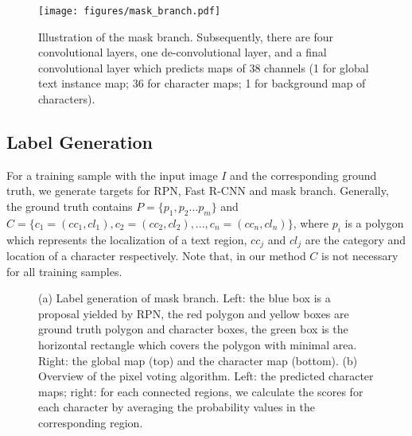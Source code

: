 \documentclass[runningheads]{llncs}
\begin{document}
\begin{figure}[!b]
\begin{center}
\texttt{[image: figures/mask\_branch.pdf]}
\end{center}
\caption{Illustration of the mask branch. Subsequently, there are four convolutional layers, one de-convolutional layer, and a final convolutional layer which predicts maps of 38 channels (1 for global text instance map; 36 for character maps; 1 for background map of characters).}
\label{fig:mask_branch}
\end{figure}

\subsection{Label Generation}
For a training sample with the input image $I$ and the corresponding ground truth,  we generate targets for RPN, Fast R-CNN and mask branch. Generally, the ground truth contains $P=\{p_{1}, p_{2}...p_{m} \}$ and $C=\{c_{1}=(cc_{1},cl_{1}),c_{2}=(cc_{2},cl_{2}), ... , c_{n}=(cc_{n},cl_{n})\}$, where $p_{i}$ is a polygon which represents the localization of a text region, $cc_{j}$ and $cl_{j}$ are the category and location of a character respectively. Note that, in our method $C$ is not necessary for all training samples. 


\begin{figure}[!b]
\begin{center}
\captionsetup[subfigure]{justification=centering}
    \centering
{}
\end{center}
 \caption{(a) Label generation of mask branch. Left: the blue box is a proposal yielded by RPN, the red polygon and yellow boxes are ground truth polygon and character boxes, the green box is the horizontal rectangle which covers the polygon with minimal area. Right: the global map (top) and the character map (bottom). (b) Overview of the pixel voting algorithm. Left: the predicted character maps; right: for each connected regions, we calculate the scores for each character by averaging the probability values in the corresponding region.}
\label{fig:denser-box}
\end{figure}
\end{document}
